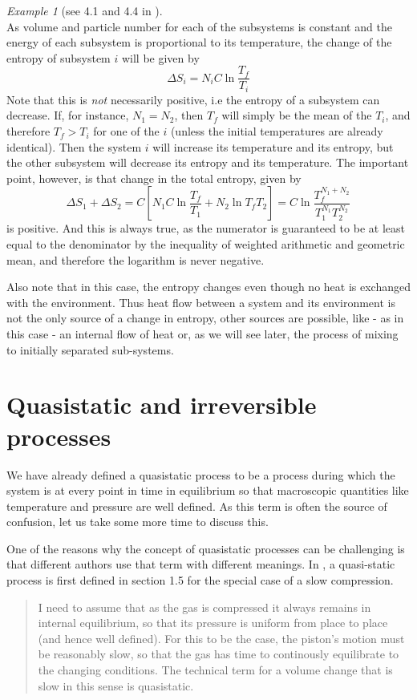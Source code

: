 \documentclass[a4paper, draft]{article}
\theoremstyle{own}
\theoremstyle{remark}
\newtheorem{example}{Example}[section]
\begin{document}
\begin{example}[see 4.1 and 4.4 in \cite{Callen}]
$$$$
As volume and particle number for each of the subsystems is constant and the energy of each subsystem is proportional to its temperature, the change of the entropy of subsystem $i$ will be given by
$$
\Delta S_i = N_i C \ln \frac{T_f}{T_i}
$$
Note that this is {\em not} necessarily positive, i.e the entropy of a subsystem can decrease. If, for instance, $N_1 = N_2$, then $T_f$ will simply be the mean of the $T_i$, and therefore $T_f > T_i$ for one of the $i$ (unless the initial temperatures are already identical). Then the system $i$ will increase its temperature and its entropy, but the other subsystem will decrease its entropy and its temperature. The important point, however, is that change in the total entropy, given by
$$
\Delta S_1 + \Delta S_2 = C [N_1 C\ln \frac{T_f}{T_1} + N_2 \ln {T_f}{T_2}] 
= C \ln \frac{T_f^{N_1 + N_2}}{T_1^{N_1} T_2^{N_2}}
$$
is positive. And this is always true, as the numerator is guaranteed to be at least equal to the denominator by the inequality of weighted arithmetic and geometric mean, and therefore the logarithm is 
never negative.

Also note that in this case, the entropy changes even though no heat is exchanged with the environment. Thus heat flow between a system and its environment is not the only source of a change in entropy, other sources are possible, like - as in this case - an internal flow of heat or, as we will see later, the process of mixing to initially separated sub-systems.

\end{example}

\section{Quasistatic and irreversible processes}

We have already defined a quasistatic process to be a process during which the system is at every point in time in equilibrium so that macroscopic quantities like temperature and pressure are well defined. As this term is often the source of confusion, let us take some more time to discuss this.

One of the reasons why the concept of quasistatic processes can be challenging is that different authors use that term with different meanings. In \cite{Schroeder}, a quasi-static process is first defined in section 1.5 for the special case of a slow compression.

\begin{quote}
I need to assume that as the gas is compressed it always remains in internal equilibrium, so that its pressure is uniform from place to place (and hence well defined). For this to be the case, the piston's motion must be reasonably slow, so that the gas has time to continously equilibrate to the changing conditions. The technical term for a volume change that is slow in this sense is quasistatic.
\end{quote}
\end{document}
